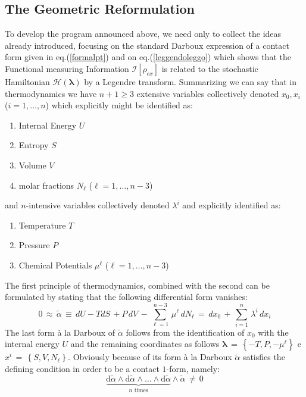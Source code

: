 \documentclass[10pt,a4paper]{article}
\def\tilde{\widetilde}
\begin{document}
\subsection{The Geometric Reformulation}
\label{geoformullo}
To develop the program announced above, we need only to collect the ideas already introduced, focusing on the standard
Darboux expression of a contact form given in eq.(\ref{formalpt}) and
on eq.(\ref{leggendoleggo}) which shows that the Functional measuring Information $\mathcal{I}\left[\rho_{ex}\right]$ is
related to the stochastic Hamiltonian $\mathcal{H}\left(\pmb{\lambda}\right)$
by a Legendre transform. Summarizing we can say that in thermodynamics we have $n+1\geq 3$ extensive variables
collectively denoted $x_0,x_i$ ($i=1,\dots,n$) which explicitly might be identified as:
\begin{enumerate}
  \item Internal Energy $U$
  \item Entropy $S$
  \item Volume $V$
  \item molar fractions $N_\ell$  ($\ell=1,\dots,n-3$)
\end{enumerate}
and $n$-intensive variables  collectively denoted $\lambda^i$
and explicitly identified as:
\begin{enumerate}
  \item Temperature $T$
  \item Pressure $P$
  \item Chemical Potentials  $\mu^\ell$  ($\ell=1,\dots,n-3$)
\end{enumerate}
The first principle of thermodynamics, combined with the second can be formulated by stating
that the following  differential form vanishes:
\begin{equation}\label{coronello}
0 \, \approx \, \tilde{\alpha} \, \equiv \, dU  -T dS \, + P \, dV
\, - \, \sum_{\ell=1}^{n-3}
 \, \mu^\ell \, dN_\ell \, = \, dx_0 \, + \, \sum_{i=1}^n
 \,\lambda^i \, dx_i
\end{equation}
The last  form  \`{a} la Darboux of $\tilde{\alpha}$ follows from the identification
of $x_0$ with the internal energy $U$ and the remaining coordinates
as follows $\pmb{\lambda}\, =
\,\left\{-T,P,-\mu^\ell\right\}$ e $x^i \, =\,
\left\{S,V,N_\ell\right\}$.
Obviously because of its form
\`{a} la Darboux $\tilde{\alpha}$ satisfies the defining condition in order to be
a contact $1$-form, namely:
\begin{equation}\label{crucco}
\underbrace{\mathrm{d}\tilde{\alpha}\wedge
\mathrm{d}\tilde{\alpha}\wedge \dots \wedge
\mathrm{d}\tilde{\alpha}}_{ \text{$n$ times}}\wedge \tilde{\alpha}\,
\neq \, 0
\end{equation}
\end{document}
